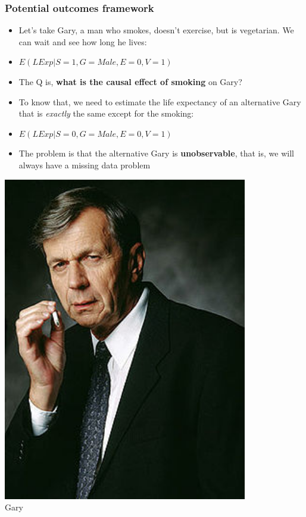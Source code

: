 \documentclass[aspectratio=43]{beamer}
\begin{document}
\begin{frame}
\frametitle{Potential outcomes framework}
\centering


\begin{minipage}{0.7\textwidth}\centering
  \begin{itemize}
    \item<1-> Let's take Gary, a man who smokes, doesn't exercise, but is vegetarian. We can wait and see how long he lives:
    \item<1->[] {\small $E(LExp|S=1, G=Male, E=0, V=1)$}
    \item<2-> The Q is, \textbf{what is the causal effect of smoking} on Gary?
    \item<3-> To know that, we need to estimate the life expectancy of an alternative Gary that is \textit{exactly} the same except for the smoking:
    \item<3->[] {\small $E(LExp|S=0, G=Male, E=0, V=1)$}
    \item<4-> The problem is that the alternative Gary is \textbf{unobservable}, that is, we will always have a missing data problem
  \end{itemize}
\end{minipage}\hfill
\begin{minipage}{0.3\textwidth}\centering
\includegraphics[width = 0.8\textwidth]{../img/smoking_man}\\Gary
\end{minipage}


\end{frame}
\end{document}
